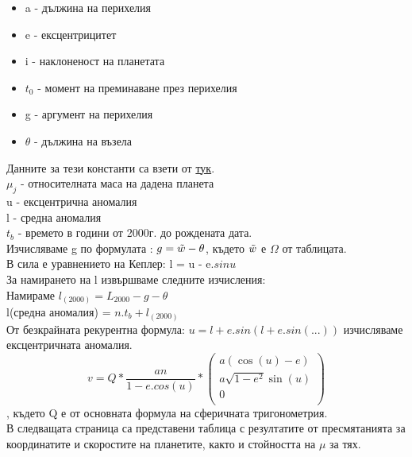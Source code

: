 \documentclass{article}
\begin{document}
\begin{itemize}
   \item  a - дължина на перихелия
   \item  e - ексцентрицитет
   \item  i - наклоненост на планетата
   \item  $t_0$ - момент на преминаване през перихелия
   \item  g - аргумент на перихелия
   \item  $ \theta $ - дължина на възела
\end{itemize}
\noindent Данните за тези константи са взети от \href{https://ssd.jpl.nasa.gov/txt/aprx_pos_planets.pdf}{тук}.\\
$ \mu_j $ - относителната маса на дадена планета \\
u - ексцентрична аномалия \\
l - средна аномалия \\
$t_b$ - времето в години от 2000г. до рождената дата.\\

\noindent Изчисляваме g по формулата : $g = \Tilde{w} - \theta $, където $\Tilde{w}$ е $\Omega$ от таблицата.\\
В сила е уравнението на Кеплер: l = u - e.$sin{u}$\\
За намирането на l извършваме следните изчисления:\\
Намираме $l_{(2000)} = L_{2000} - g - \theta$ \\
l(средна аномалия) = $n . t_b + l_{(2000)} $  \\

\noindent От безкрайната рекурентна формула: $u= l + e.sin(l+e.sin(...))$ изчисляваме ексцентричната аномалия.
\begin{equation}
v = Q * \frac{an}{1- e.cos(u)}*
\begin{pmatrix}
a(\cos(u) - e)\\
a\sqrt{1-e^2} \sin(u)\\
0\\
\end{pmatrix}
\end{equation}, където Q е от основната формула на сферичната тригонометрия.\\

В следващата страница са представени таблица с резултатите от пресмятанията за координатите и скоростите на планетите, както и стойността на $\mu$ за тях.
\clearpage
\end{document}
